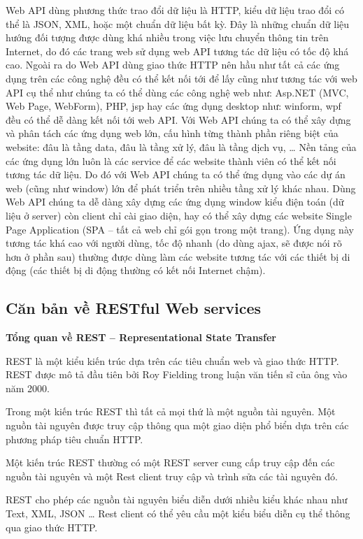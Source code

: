 Web API dùng phương thức trao đổi dữ liệu là HTTP, kiểu dữ liệu trao đổi có thể là JSON, XML, hoặc một chuẩn dữ liệu bất kỳ. Đây là những chuẩn dữ liệu hướng đối tượng được dùng khá nhiều trong việc lưu chuyển thông tin trên Internet, do đó các trang web sử dụng web API tương tác dữ liệu có tốc độ khá cao. Ngoài ra do Web API dùng giao thức HTTP nên hầu như tất cả các ứng dụng trên các công nghệ đều có thể kết nối tới để lấy cũng như tương tác với web API cụ thể như chúng ta có thể dùng các công nghệ web như: Asp.NET (MVC, Web Page, WebForm), PHP, jsp hay các ứng dụng desktop như: winform, wpf đều có thể dễ dàng kết nối tới web API. Với Web API chúng ta có thể xây dựng và phân tách các ứng dụng web lớn, cấu hình từng thành phần riêng biệt của website: đâu là tầng data, đâu là tầng xử lý, đâu là tầng dịch vụ, … Nền tảng của các ứng dụng lớn luôn là các service để các website thành viên có thể kết nối tương tác dữ liệu. Do đó với Web API chúng ta có thể ứng dụng vào các dự án web (cũng như window) lớn để phát triển trên nhiều tầng xử lý khác nhau. Dùng Web API chúng ta dễ dàng xây dựng các ứng dụng window kiểu điện toán (dữ liệu ở server) còn client chỉ cài giao diện, hay có thể xây dựng các website Single Page Application (SPA – tất cả web chỉ gói gọn trong một trang). Ứng dụng này tương tác khá cao với người dùng, tốc độ nhanh (do dùng ajax, sẽ được nói rõ hơn ở phần sau) thường được dùng làm các website tương tác với các thiết bị di động (các thiết bị di động thường có kết nối Internet chậm).

\subsection{Căn bản về RESTful Web services}

\textbf{Tổng quan về REST – Representational State Transfer}

REST là một kiểu kiến trúc dựa trên các tiêu chuẩn web và giao thức HTTP. REST được mô tả đầu tiên bởi Roy Fielding trong luận văn tiến sĩ của ông vào năm 2000.

Trong một kiến trúc REST thì tất cả mọi thứ là một nguồn tài nguyên. Một nguồn tài nguyên được truy cập thông qua một giao diện phổ biển dựa trên các phương pháp tiêu chuẩn HTTP.

Một kiến trúc REST thường có một REST server cung cấp truy cập đến các nguồn tài nguyên và một Rest client truy cập và trình sửa các tài nguyên đó.

REST cho phép các nguồn tài nguyên biểu diễn dưới nhiều kiểu khác nhau như Text, XML, JSON … Rest client có thể yêu cầu một kiểu biểu diễn cụ thể thông qua giao thức HTTP.

